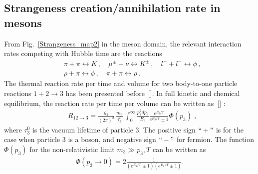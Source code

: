 \subsection{Strangeness creation/annihilation rate in mesons}
From Fig.~\ref{Strangeness_map2} in the meson domain, the relevant interaction rates competing with Hubble time are the reactions
\begin{align}
 &\pi+\pi\leftrightarrow K\,,\quad\mu^\pm+\nu\leftrightarrow K^\pm\,,\quad l^++l^-\leftrightarrow\phi\,,\\
 &\rho+\pi\leftrightarrow\phi\,,\quad \pi+\pi\leftrightarrow\rho\,.
\end{align}
The thermal reaction rate per time and volume for two body-to-one particle reactions $1+2\rightarrow 3$ has been presented before~[\cite{Koch:1986ud,Kuznetsova:2008jt,Kuznetsova:2010pi}]. In full kinetic and chemical equilibrium, the reaction rate per time per volume can be written as~[\cite{Kuznetsova:2010pi}] :
\begin{align}
&R_{12\to 3}=\frac{g_3}{(2\pi)^2}\,\frac{m_3}{\tau^0_3}\,\int^\infty_0\frac{p^2_3dp_3}{E_3}\frac{e^{E_3/T}}{e^{E_3/T}\pm1}\Phi(p_3)\;,
\end{align}
where $\tau^0_3$ is the vacuum lifetime of particle $3$. The positive sign $``+"$ is for the case when particle $3$ is a boson, and negative sign $``-"$ for fermion. The function $\Phi(p_3)$ for the non-relativistic limit $m_3\gg p_3,T$ can be written as 
\begin{align}
\Phi(p_3\to0)=2\frac{1}{(e^{E_1/T}\pm1)(e^{E_2/T}\pm1)}.
\end{align}



